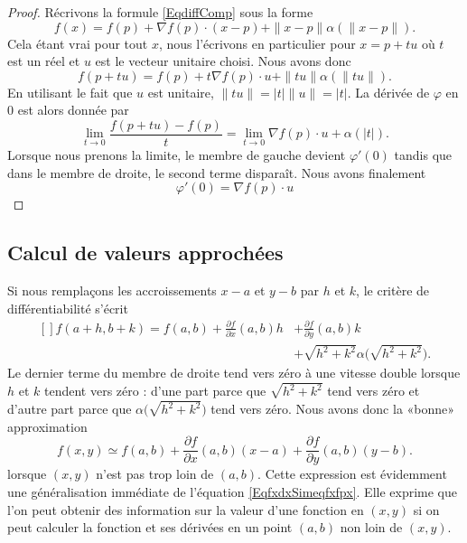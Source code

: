 \begin{proof}
    Récrivons la formule \eqref{EqdiffComp} sous la forme
    \begin{equation}
        f(x)=f(p)+\nabla f(p)\cdot (x-p)+\| x-p \|\alpha(\| x-p \|).
    \end{equation}
    Cela étant vrai pour tout $x$, nous l'écrivons en particulier pour $x=p+tu$ où $t$ est un réel et $u$ est le vecteur unitaire choisi. Nous avons donc
    \begin{equation}
        f(p+tu)=f(p)+t\nabla f(p)\cdot u+\| tu \|\alpha(\| tu \|).
    \end{equation}
    En utilisant le fait que $u$ est unitaire, $\| tu \|=| t |\| u \|=| t |$. La dérivée de $\varphi$ en $0$ est alors donnée par
    \begin{equation}
        \lim_{t\to 0} \frac{ f(p+tu)-f(p) }{ t }=\lim_{t\to 0} \nabla f(p)\cdot u+\alpha(| t |).    
    \end{equation}
    Lorsque nous prenons la limite, le membre de gauche devient $\varphi'(0)$ tandis que dans le membre de droite, le second terme disparaît. Nous avons finalement
    \begin{equation}
        \varphi'(0)=\nabla f(p)\cdot u
    \end{equation}
\end{proof}

\subsection{Calcul de valeurs approchées}

Si nous remplaçons les accroissements $x-a$ et $y-b$ par $h$ et $k$, le critère de différentiabilité s'écrit
\begin{equation}
    \begin{aligned}[]
        f(a+h,b+k)=f(a,b)+\frac{ \partial f }{ \partial x }(a,b)h&+\frac{ \partial f }{ \partial y }(a,b)k\\
        &+\sqrt{h^2+k^2}\alpha\big( \sqrt{h^2+k^2} \big).
    \end{aligned}
\end{equation}
Le dernier terme du membre de droite tend vers zéro à une vitesse double lorsque $h$ et $k$ tendent vers zéro : d'une part parce que $\sqrt{h^2+k^2}$ tend vers zéro et d'autre part parce que $\alpha\big( \sqrt{h^2+k^2} \big)$ tend vers zéro. Nous avons donc la «bonne» approximation
\begin{equation}        \label{EqFormApproxfxyab}
    f(x,y)\simeq f(a,b)+\frac{ \partial f }{ \partial x }(a,b)(x-a)+\frac{ \partial f }{ \partial y }(a,b)(y-b).
\end{equation}
lorsque $(x,y)$ n'est pas trop loin de $(a,b)$. Cette expression est évidemment une généralisation immédiate de l'équation \eqref{EqfxdxSimeqfxfpx}. Elle exprime que l'on peut obtenir des information sur la valeur d'une fonction en $(x,y)$ si on peut calculer la fonction et ses dérivées en un point $(a,b)$ non loin de $(x,y)$.

